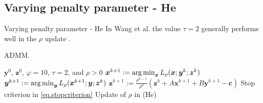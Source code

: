 \documentclass[8pt,red]{beamer}
\theoremstyle{plain}
\theoremstyle{definition}
\theoremstyle{remark}
\newcommand{\argmin}{\operatornamewithlimits{\mathrm{arg\,min}}}
\newcommand{\bi}[1]{\ensuremath{\boldsymbol{#1}}}
\begin{document}
\subsection{Varying penalty parameter - He}
\begin{frame}{Varying penalty parameter - He}
In Wang et al. the value $\tau = 2$ generally performs well in the $\rho$ update \citep{WANG2001}.

\begin{algorithm}[H]
  \scriptsize
  \caption{ADMM.}
  \label{alg:prototype.vp-N-He}
  \begin{algorithmic}[1]
    \Require
    $\bi{y}^{0}$, $\bi{z}^{0}$, $\varphi = 10$, $\tau = 2$, and $\rho > 0$ 
    \State
    $\bi{x}^{k+1} 
    := \argmin_{\bi{x}} L_{\rho}(\bi{x};{\bi{y}}^{k};{\bi{z}}^{k})$ 
    \State
    $\bi{y}^{k+1} 
    := \argmin_{\bi{y}} L_{\rho}(\bi{x}^{k+1};\bi{y};{\bi{z}}^{k})$ 
    \State
    $\bi{z}^{k+1} 
  := \frac{\rho^{k-1}}{\rho^{k}} \left( \bi{z}^{k} + A \bi{x}^{k+1} + B \bi{y}^{k+1} - \bi{c} \right)$ 
    \State
    Stop criterion in \eqref{eq.stopcriterion}
    \State
    Update of $\rho$ in (He)
    \EndFor
  \end{algorithmic}
\end{algorithm}
\end{frame}
\end{document}

